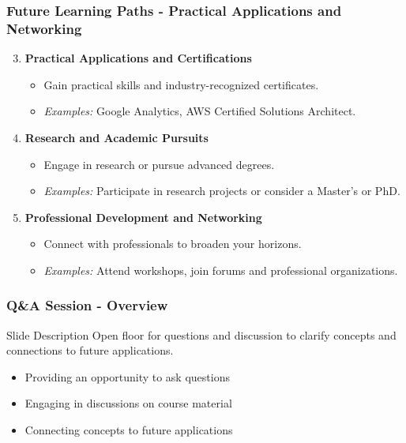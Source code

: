 \documentclass[aspectratio=169]{beamer}
\begin{document}
\begin{frame}[fragile]
    \frametitle{Future Learning Paths - Practical Applications and Networking}
    \begin{enumerate}
        \setcounter{enumi}{2} %
        \item \textbf{Practical Applications and Certifications}
        \begin{itemize}
            \item Gain practical skills and industry-recognized certificates.
            \item \textit{Examples:} Google Analytics, AWS Certified Solutions Architect.
        \end{itemize}
        
        \item \textbf{Research and Academic Pursuits}
        \begin{itemize}
            \item Engage in research or pursue advanced degrees.
            \item \textit{Examples:} Participate in research projects or consider a Master's or PhD.
        \end{itemize}
        
        \item \textbf{Professional Development and Networking}
        \begin{itemize}
            \item Connect with professionals to broaden your horizons.
            \item \textit{Examples:} Attend workshops, join forums and professional organizations.
        \end{itemize}
    \end{enumerate}
\end{frame}

\begin{frame}[fragile]
    \frametitle{Q\&A Session - Overview}
    \begin{block}{Slide Description}
        Open floor for questions and discussion to clarify concepts and connections to future applications.
    \end{block}
    \begin{itemize}
        \item Providing an opportunity to ask questions 
        \item Engaging in discussions on course material
        \item Connecting concepts to future applications
    \end{itemize}
\end{frame}
\end{document}
